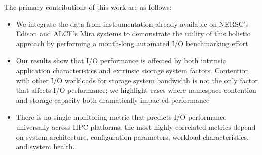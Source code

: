The primary contributions of this work are as follows:
\begin{itemize}[leftmargin=*]
\item We integrate the data from instrumentation already available on NERSC's Edison and ALCF's Mira systems to demonstrate the utility of this holistic approach by performing a month-long automated I/O benchmarking effort 
\item Our results show that I/O performance is affected by both intrinsic application characteristics and extrinsic storage system factors. Contention with other I/O workloads for storage system bandwidth is not the only factor that affects I/O performance;
we highlight cases  where namespace contention and storage capacity both dramatically impacted performance
\item There is no single monitoring metric that predicts I/O performance
universally across HPC platforms; the most highly correlated metrics depend on system architecture, configuration parameters, workload characteristics, and system health.
\end{itemize}
